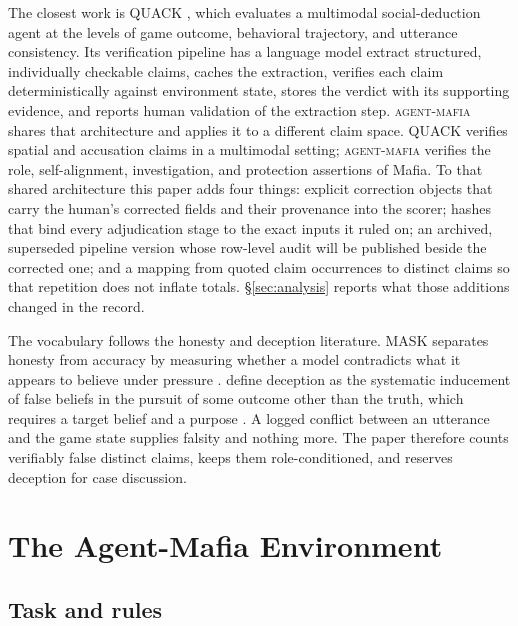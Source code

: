 \documentclass[11pt]{article}
\newcommand{\sys}{\textsc{agent-mafia}}
\begin{document}
The closest work is QUACK \citep{yuan2026quack}, which evaluates a multimodal social-deduction agent at the levels of game outcome, behavioral trajectory, and utterance consistency. Its verification pipeline has a language model extract structured, individually checkable claims, caches the extraction, verifies each claim deterministically against environment state, stores the verdict with its supporting evidence, and reports human validation of the extraction step. \sys{} shares that architecture and applies it to a different claim space. QUACK verifies spatial and accusation claims in a multimodal setting; \sys{} verifies the role, self-alignment, investigation, and protection assertions of Mafia. To that shared architecture this paper adds four things: explicit correction objects that carry the human's corrected fields and their provenance into the scorer; hashes that bind every adjudication stage to the exact inputs it ruled on; an archived, superseded pipeline version whose row-level audit will be published beside the corrected one; and a mapping from quoted claim occurrences to distinct claims so that repetition does not inflate totals. \S\ref{sec:analysis} reports what those additions changed in the record.

The vocabulary follows the honesty and deception literature. MASK separates honesty from accuracy by measuring whether a model contradicts what it appears to believe under pressure \citep{ren2025mask}. \citet{park2024aideception} define deception as the systematic inducement of false beliefs in the pursuit of some outcome other than the truth, which requires a target belief and a purpose \citep[see also][]{hagendorff2024deception,shi2026taxonomy}. A logged conflict between an utterance and the game state supplies falsity and nothing more. The paper therefore counts verifiably false distinct claims, keeps them role-conditioned, and reserves deception for case discussion.

\section{The Agent-Mafia Environment}
\label{sec:env}

\subsection{Task and rules}
\end{document}
